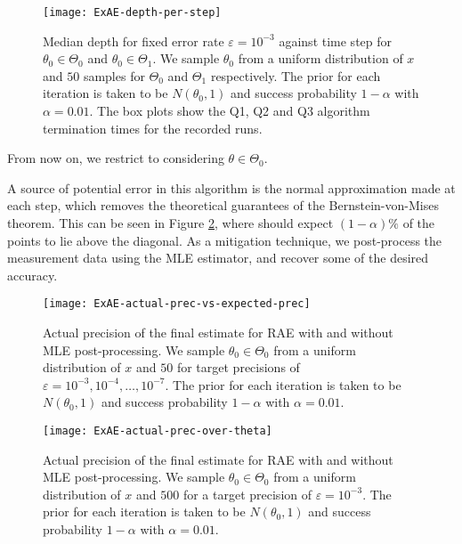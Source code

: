 \begin{figure}[htbp]
	\centering
	\texttt{[image: ExAE-depth-per-step]}
	\caption{Median depth for fixed error rate $\varepsilon = 10^{-3}$ against time step for $\theta_0 \in \Theta_0$ and $\theta_0 \in \Theta_1$. We sample $\theta_0$ from a uniform distribution of $x$ and $50$ samples for $\Theta_0$ and $ \Theta_1$ respectively. The prior for each iteration is taken to be $N(\theta_0, 1)$ and success probability $1 - \alpha$ with $\alpha = 0.01$. The box plots show the Q1, Q2 and Q3 algorithm termination times for the recorded runs.}
	\label{fig::ExAE-depth-per-step}
\end{figure}

From now on, we restrict to considering $\theta \in \Theta_0$.

A source of potential error in this algorithm is the normal approximation made at each step, which removes the theoretical guarantees of the Bernstein-von-Mises theorem. This can be seen in Figure \ref{fig::ExAE-actual-prec-vs-expected-prec}, where should expect $(1-\alpha)\%$ of the points to lie above the diagonal. As a mitigation technique, we post-process the measurement data using the MLE estimator, and recover some of the desired accuracy.

\begin{figure}[htbp]
	\centering
	\texttt{[image: ExAE-actual-prec-vs-expected-prec]}
	\caption{Actual precision of the final estimate for RAE with and without MLE post-processing. We sample $\theta_0 \in \Theta_0$ from a uniform distribution of $x$ and $50$ for target precisions of $\varepsilon = 10^{-3}, 10^{-4}, \ldots, 10^{-7} $. The prior for each iteration is taken to be $N(\theta_0, 1)$ and success probability $1 - \alpha$ with $\alpha = 0.01$.}
	\label{fig::ExAE-actual-prec-vs-expected-prec}
\end{figure}

\begin{figure}[htbp]
	\centering
	\texttt{[image: ExAE-actual-prec-over-theta]}
	\caption{Actual precision of the final estimate for RAE with and without MLE post-processing. We sample $\theta_0 \in \Theta_0$ from a uniform distribution of $x$ and $500$ for a target precision of $\varepsilon = 10^{-3}$. The prior for each iteration is taken to be $N(\theta_0, 1)$ and success probability $1 - \alpha$ with $\alpha = 0.01$.}
	\label{fig::ExAE-actual-prec-over-theta}
\end{figure}

